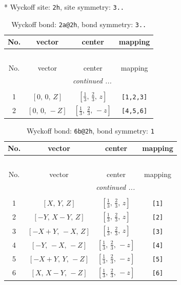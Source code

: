 \documentclass[fleqn,8pt]{jsarticle}
\begin{document}
* Wyckoff site: {\tt 2h}, site symmetry: {\tt 3..}
\renewcommand{\arraystretch}{1.2}
\begin{longtable}{cccc}
\caption{Wyckoff bond: {\tt 2a@2h}, bond symmetry: {\tt 3..}}
 \\
 \hline \hline
No. & vector & center & mapping \\ \hline \endfirsthead

\multicolumn{3}{l}{\tablename\ \thetable{}} \\
 \hline \hline
No. & vector & center & mapping \\ \hline \endhead

 \hline \hline
\multicolumn{3}{r}{\footnotesize\it continued ...} \\ \endfoot

 \hline \hline
\multicolumn{3}{r}{} \\ \endlastfoot

1 & $\left[ 0,\, 0,\, Z \right]$ & $\left[ \frac{1}{3},\, \frac{2}{3},\, z \right]$ & {\tt [1,2,3]} \\ \hline
2 & $\left[ 0,\, 0,\, - Z \right]$ & $\left[ \frac{1}{3},\, \frac{2}{3},\, - z \right]$ & {\tt [4,5,6]} \\
\end{longtable}
\renewcommand{\arraystretch}{1.2}
\begin{longtable}{cccc}
\caption{Wyckoff bond: {\tt 6b@2h}, bond symmetry: {\tt 1}}
 \\
 \hline \hline
No. & vector & center & mapping \\ \hline \endfirsthead

\multicolumn{3}{l}{\tablename\ \thetable{}} \\
 \hline \hline
No. & vector & center & mapping \\ \hline \endhead

 \hline \hline
\multicolumn{3}{r}{\footnotesize\it continued ...} \\ \endfoot

 \hline \hline
\multicolumn{3}{r}{} \\ \endlastfoot

1 & $\left[ X,\, Y,\, Z \right]$ & $\left[ \frac{1}{3},\, \frac{2}{3},\, z \right]$ & {\tt [1]} \\ \hline
2 & $\left[ - Y,\, X - Y,\, Z \right]$ & $\left[ \frac{1}{3},\, \frac{2}{3},\, z \right]$ & {\tt [2]} \\ \hline
3 & $\left[ - X + Y,\, - X,\, Z \right]$ & $\left[ \frac{1}{3},\, \frac{2}{3},\, z \right]$ & {\tt [3]} \\ \hline
4 & $\left[ - Y,\, - X,\, - Z \right]$ & $\left[ \frac{1}{3},\, \frac{2}{3},\, - z \right]$ & {\tt [4]} \\ \hline
5 & $\left[ - X + Y,\, Y,\, - Z \right]$ & $\left[ \frac{1}{3},\, \frac{2}{3},\, - z \right]$ & {\tt [5]} \\ \hline
6 & $\left[ X,\, X - Y,\, - Z \right]$ & $\left[ \frac{1}{3},\, \frac{2}{3},\, - z \right]$ & {\tt [6]} \\
\end{longtable}
\end{document}
